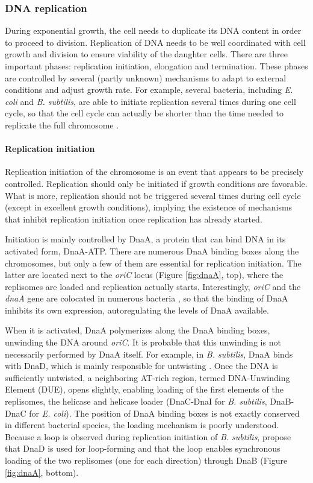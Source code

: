 \subsubsection{DNA replication}

During exponential growth, the cell needs to duplicate its DNA content in order to proceed to division. Replication of DNA needs to be well coordinated with cell growth and division to ensure viability of the daughter cells. There are three important phases: replication initiation, elongation and termination. These phases are controlled by several (partly unknown) mechanisms to adapt to external conditions and adjust growth rate. For example, several bacteria, including \textit{E. coli} and \textit{B. subtilis}, are able to initiate replication several times during one cell cycle, so that the cell cycle can actually be shorter than the time needed to replicate the full chromosome \citep{reyes-lamothe_chromosome_2012}.

\paragraph{Replication initiation} Replication initiation of the chromosome is an event that appears to be precisely controlled. Replication should only be initiated if growth conditions are favorable. What is more, replication should not be triggered several times during cell cycle (except in excellent growth conditions), implying the existence of mechanisms that inhibit replication initiation once replication has already started.

Initiation is mainly controlled by DnaA, a protein that can bind DNA in its activated form, DnaA-ATP. There are numerous DnaA binding boxes along the chromosomes, but only a few of them are essential for replication initiation. The latter are located next to the \textit{oriC} locus (Figure \ref{fig:dnaA}, top), where the replisomes are loaded and replication actually starts. Interestingly, \textit{oriC} and the \textit{dnaA} gene are colocated in numerous bacteria \citep{briggs_chromosomal_2012}, so that the binding of DnaA inhibits its own expression, autoregulating the levels of DnaA available.

When it is activated, DnaA polymerizes along the DnaA binding boxes, unwinding the DNA around \textit{oriC}. It is probable that this unwinding is not necessarily performed by DnaA itself. For example, in \textit{B. subtilis}, DnaA binds with DnaD, which is mainly responsible for untwisting \citep{briggs_chromosomal_2012}. Once the DNA is sufficiently untwisted, a neighboring AT-rich region, termed DNA-Unwinding Element (DUE), opens slightly, enabling loading of the first elements of the replisomes, the helicase and helicase loader (DnaC-DnaI for \textit{B. subtilis}, DnaB-DnaC for \textit{E. coli}). The position of DnaA binding boxes is not exactly conserved in different bacterial species, the loading mechanism is poorly understood. Because a loop is observed during replication initiation of \textit{B. subtilis}, \citet{briggs_chromosomal_2012} propose that DnaD is used for loop-forming and that the loop enables synchronous loading of the two replisomes (one for each direction) through DnaB (Figure \ref{fig:dnaA}, bottom).

